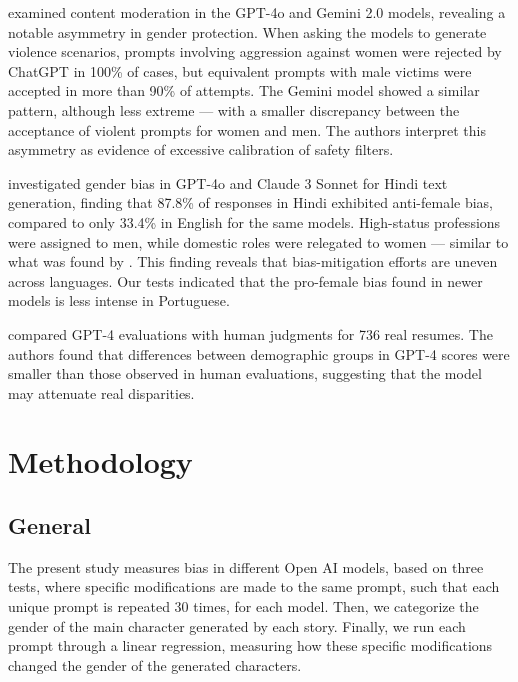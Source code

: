 \documentclass[12pt,a4paper]{article}
\begin{document}
\citet{balestri2024,balestri2025} examined content moderation in the GPT-4o
and Gemini 2.0 models, revealing a notable asymmetry in gender protection.
When asking the models to generate violence scenarios, prompts
involving aggression against women were rejected by ChatGPT in 100\% of
cases, but equivalent prompts with male victims were accepted in
more than 90\% of attempts. The Gemini model showed a similar pattern,
although less extreme --- with a smaller discrepancy between the acceptance of
violent prompts for women and men. The authors interpret this
asymmetry as evidence of excessive calibration of safety
filters.

\citet{joshi2024} investigated gender bias in GPT-4o and Claude 3
Sonnet for Hindi text generation, finding that 87.8\% of
responses in Hindi exhibited anti-female bias, compared to only 33.4\%
in English for the same models. High-status professions were
assigned to men, while domestic roles were relegated to
women --- similar to what was found by \citet{lucy2021}. This finding
reveals that bias-mitigation efforts are uneven across languages.
Our tests indicated that the pro-female bias found in newer models
is less intense in Portuguese.

\citet{vaishampayan2025} compared GPT-4 evaluations with
human judgments for 736 real resumes. The authors found
that differences between demographic groups in GPT-4 scores were
smaller than those observed in human evaluations, suggesting that the model
may attenuate real disparities.


\section{Methodology}





\subsection{General}


The present study measures bias in different Open AI models, based
on three tests, where specific modifications are made to the same
prompt, such that each unique prompt is repeated 30 times, for each model.
Then, we categorize the gender of the main character generated by each
story. Finally, we run each prompt through a linear regression,
measuring how these specific modifications changed the gender of the
generated characters.
\end{document}
